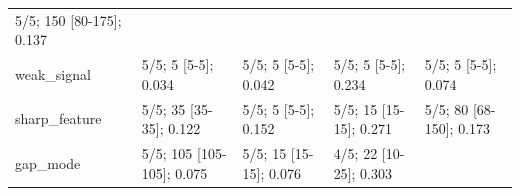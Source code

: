 \documentclass[
]{article}
\begin{document}
\begin{longtable}[]{@{}lllll@{}}
\begin{minipage}[t]{0.17\columnwidth}
5/5; 150 {[}80-175{]}; 0.137\strut
\end{minipage}\tabularnewline
\begin{minipage}[t]{0.18\columnwidth}\raggedright
weak\_signal\strut
\end{minipage} & \begin{minipage}[t]{0.21\columnwidth}\raggedright
5/5; 5 {[}5-5{]}; 0.034\strut
\end{minipage} & \begin{minipage}[t]{0.15\columnwidth}\raggedright
5/5; 5 {[}5-5{]}; 0.042\strut
\end{minipage} & \begin{minipage}[t]{0.15\columnwidth}\raggedright
5/5; 5 {[}5-5{]}; 0.234\strut
\end{minipage} & \begin{minipage}[t]{0.17\columnwidth}\raggedright
5/5; 5 {[}5-5{]}; 0.074\strut
\end{minipage}\tabularnewline
\begin{minipage}[t]{0.18\columnwidth}\raggedright
sharp\_feature\strut
\end{minipage} & \begin{minipage}[t]{0.21\columnwidth}\raggedright
5/5; 35 {[}35-35{]}; 0.122\strut
\end{minipage} & \begin{minipage}[t]{0.15\columnwidth}\raggedright
5/5; 5 {[}5-5{]}; 0.152\strut
\end{minipage} & \begin{minipage}[t]{0.15\columnwidth}\raggedright
5/5; 15 {[}15-15{]}; 0.271\strut
\end{minipage} & \begin{minipage}[t]{0.17\columnwidth}\raggedright
5/5; 80 {[}68-150{]}; 0.173\strut
\end{minipage}\tabularnewline
\begin{minipage}[t]{0.18\columnwidth}\raggedright
gap\_mode\strut
\end{minipage} & \begin{minipage}[t]{0.21\columnwidth}\raggedright
5/5; 105 {[}105-105{]}; 0.075\strut
\end{minipage} & \begin{minipage}[t]{0.15\columnwidth}\raggedright
5/5; 15 {[}15-15{]}; 0.076\strut
\end{minipage} & \begin{minipage}[t]{0.15\columnwidth}\raggedright
4/5; 22 {[}10-25{]}; 0.303\strut
\end{minipage} & \begin{minipage}[t]{0.17\columnwidth}\raggedright

\end{minipage}
\end{longtable}
\end{document}
